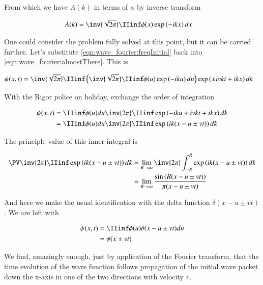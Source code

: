 From which we have $A(k)$ in terms of $\phi$ by inverse transform

\begin{align}\label{eqn:wave_fourier:freqInitial}
A(k) &= \inv{\sqrt{2\pi}} \IIinf \phi(x) \exp\left( -i k x \right) dx
\end{align}

One could consider the problem fully solved at this point, but it can be carried further.  Let's substitute 
\ref{eqn:wave_fourier:freqInitial} back into \ref{eqn:wave_fourier:almostThere}.  This is

\begin{align*}
{\psi}(x,t) &= \inv{\sqrt{2\pi}} \IIinf \left( \inv{\sqrt{2\pi}} \IIinf \phi(u) \exp\left( -i k u \right) du \right) \exp\left( \pm i v k t + i k x \right) dk
\end{align*}

With the Rigor police on holiday, exchange the order of integration

\begin{align*}
{\psi}(x,t) 
&= \IIinf \phi(u) du \inv{{2\pi}} \IIinf \exp\left( -i k u \pm i v k t + i k x \right) dk \\
&= \IIinf \phi(u) du \inv{{2\pi}} \IIinf \exp\left( i k (x - u \pm v t ) \right) dk \\
\end{align*}

The principle value of this inner integral is

\begin{align*}
\PV \inv{{2\pi}} \IIinf \exp\left( i k (x - u \pm v t ) \right) dk 
&= \lim_{R\rightarrow \infty} \inv{2\pi} \int_{-R}^R \exp\left( i k (x - u \pm v t ) \right) dk  \\
&= \lim_{R\rightarrow \infty} \frac{\sin\left( R (x - u \pm v t ) \right) }{ \pi (x - u \pm v t) } \\
\end{align*}

And here we make the usual identification with the delta function $\delta( x - u \pm v t )$.  We are left with

\begin{align*}
{\psi}(x,t) 
&= \IIinf \phi(u) \delta( x - u \pm v t ) du \\
&= \phi( x \pm v t )
\end{align*}

We find, amazingly enough, just by application of the Fourier transform, that the time evolution of the
wave function follows propagation of the initial wave packet down the x-axis in one of the two directions with velocity $v$.

